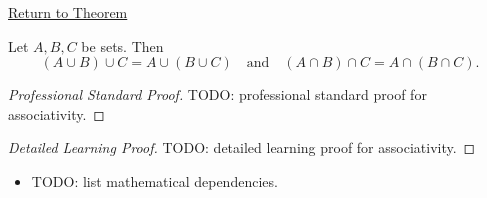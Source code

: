 \newpage
{}
\label{prf:associativity}

\begin{remark*}[Return]
\hyperref[thm:associativity]{Return to Theorem}
\end{remark*}

\begin{theorem*}
Let $A,B,C$ be sets. Then
\[
(A \cup B) \cup C = A \cup (B \cup C)
\quad\text{and}\quad
(A \cap B) \cap C = A \cap (B \cap C).
\]
\end{theorem*}

\begin{proof}[Professional Standard Proof]
\LRAProofBodyStart
TODO: professional standard proof for associativity.
\end{proof}

\begin{proof}[Detailed Learning Proof]
\LRAProofBodyStart
TODO: detailed learning proof for associativity.
\end{proof}

\begin{remark*}
\end{remark*}

\begin{dependencies}
\begin{itemize}
  \item TODO: list mathematical dependencies.
\end{itemize}
\end{dependencies}

\clearpage
